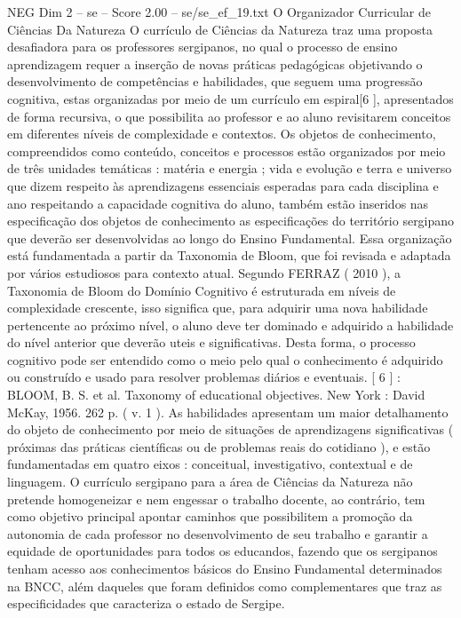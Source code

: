 \begin{textsample}{NEG Dim 2 – se – Score 2.00 – se/se\_ef\_19.txt}  \label{ex:f2_neg_267}
O Organizador Curricular de Ciências Da Natureza O currículo de Ciências da Natureza traz uma proposta desafiadora para os professores sergipanos, no qual o processo de ensino aprendizagem requer a inserção de novas práticas pedagógicas objetivando o desenvolvimento de competências e habilidades, que seguem uma progressão cognitiva, estas organizadas por meio de um currículo em espiral[6 ], apresentados de forma recursiva, o que possibilita ao professor e ao aluno revisitarem conceitos em diferentes níveis de complexidade e contextos.
Os objetos de conhecimento, compreendidos como conteúdo, conceitos e processos estão organizados por meio de três unidades temáticas : matéria e energia ; vida e evolução e terra e universo que dizem respeito às aprendizagens essenciais esperadas para cada disciplina e ano respeitando a capacidade cognitiva do aluno, também estão inseridos nas especificação dos objetos de conhecimento as especificações do território sergipano que deverão ser desenvolvidas ao longo do Ensino Fundamental.
Essa organização está fundamentada a partir da Taxonomia de Bloom, que foi revisada e adaptada por vários estudiosos para contexto atual.
Segundo FERRAZ ( 2010 ), a Taxonomia de Bloom do Domínio Cognitivo é estruturada em níveis de complexidade crescente, isso significa que, para adquirir uma nova habilidade pertencente ao próximo nível, o aluno deve ter dominado e adquirido a habilidade do nível anterior que deverão uteis e significativas.
Desta forma, o processo cognitivo pode ser entendido como o meio pelo qual o conhecimento é adquirido ou construído e usado para resolver problemas diários e eventuais. [ 6 ] : BLOOM, B.
S. et al.
Taxonomy of educational objectives.
New York : David McKay, 1956. 262 p. ( v. 1 ).
As habilidades apresentam um maior detalhamento do objeto de conhecimento por meio de situações de aprendizagens significativas ( próximas das práticas científicas ou de problemas reais do cotidiano ), e estão fundamentadas em quatro eixos : conceitual, investigativo, contextual e de linguagem.
O currículo sergipano para a área de Ciências da Natureza não pretende homogeneizar e nem engessar o trabalho docente, ao contrário, tem como objetivo principal apontar caminhos que possibilitem a promoção da autonomia de cada professor no desenvolvimento de seu trabalho e garantir a equidade de oportunidades para todos os educandos, fazendo que os sergipanos tenham acesso aos conhecimentos básicos do Ensino Fundamental determinados na BNCC, além daqueles que foram definidos como complementares que traz as especificidades que caracteriza o estado de Sergipe.

\end{textsample}
